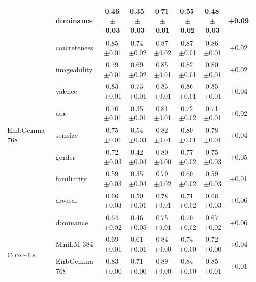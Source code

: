 \begin{table}[t]
\begin{tabular}{@{}llcccccc@{}}
     & dominance & 0.46\,\scriptsize$\pm$0.03 & 0.35\,\scriptsize$\pm$0.03 & 0.71\,\scriptsize$\pm$0.01 & 0.55\,\scriptsize$\pm$0.02 & 0.48\,\scriptsize$\pm$0.03 & +0.09 \\
    \midrule
    \multirow{9}{*}{EmbGemma-768} & concreteness & 0.85\,\scriptsize$\pm$0.01 & 0.74\,\scriptsize$\pm$0.02 & 0.87\,\scriptsize$\pm$0.02 & 0.87\,\scriptsize$\pm$0.01 & 0.86\,\scriptsize$\pm$0.01 & +0.02 \\
     & imageability & 0.79\,\scriptsize$\pm$0.01 & 0.69\,\scriptsize$\pm$0.02 & 0.85\,\scriptsize$\pm$0.01 & 0.82\,\scriptsize$\pm$0.01 & 0.80\,\scriptsize$\pm$0.01 & +0.02 \\
     & valence & 0.83\,\scriptsize$\pm$0.01 & 0.73\,\scriptsize$\pm$0.01 & 0.83\,\scriptsize$\pm$0.01 & 0.86\,\scriptsize$\pm$0.01 & 0.85\,\scriptsize$\pm$0.01 & +0.04 \\
     & aoa & 0.70\,\scriptsize$\pm$0.01 & 0.35\,\scriptsize$\pm$0.01 & 0.81\,\scriptsize$\pm$0.01 & 0.72\,\scriptsize$\pm$0.02 & 0.71\,\scriptsize$\pm$0.01 & +0.02 \\
     & semsize & 0.75\,\scriptsize$\pm$0.01 & 0.54\,\scriptsize$\pm$0.03 & 0.82\,\scriptsize$\pm$0.01 & 0.80\,\scriptsize$\pm$0.01 & 0.78\,\scriptsize$\pm$0.01 & +0.04 \\
     & gender & 0.72\,\scriptsize$\pm$0.03 & 0.42\,\scriptsize$\pm$0.04 & 0.80\,\scriptsize$\pm$0.00 & 0.77\,\scriptsize$\pm$0.02 & 0.75\,\scriptsize$\pm$0.03 & +0.05 \\
     & familiarity & 0.59\,\scriptsize$\pm$0.03 & 0.35\,\scriptsize$\pm$0.04 & 0.79\,\scriptsize$\pm$0.02 & 0.60\,\scriptsize$\pm$0.02 & 0.59\,\scriptsize$\pm$0.03 & +0.01 \\
     & arousal & 0.66\,\scriptsize$\pm$0.03 & 0.50\,\scriptsize$\pm$0.01 & 0.78\,\scriptsize$\pm$0.01 & 0.71\,\scriptsize$\pm$0.02 & 0.66\,\scriptsize$\pm$0.03 & +0.06 \\
     & dominance & 0.64\,\scriptsize$\pm$0.02 & 0.46\,\scriptsize$\pm$0.05 & 0.75\,\scriptsize$\pm$0.01 & 0.70\,\scriptsize$\pm$0.02 & 0.67\,\scriptsize$\pm$0.02 & +0.06 \\
    \midrule
    \multirow{2}{*}{\textsc{Conc-40k}} & MiniLM-384 & 0.69\,\scriptsize$\pm$0.01 & 0.61\,\scriptsize$\pm$0.01 & 0.84\,\scriptsize$\pm$0.00 & 0.74\,\scriptsize$\pm$0.00 & 0.72\,\scriptsize$\pm$0.00 & +0.04 \\
     & EmbGemma-768 & 0.83\,\scriptsize$\pm$0.00 & 0.71\,\scriptsize$\pm$0.00 & 0.89\,\scriptsize$\pm$0.00 & 0.84\,\scriptsize$\pm$0.00 & 0.85\,\scriptsize$\pm$0.01 & +0.01 \\

\end{tabular}
\end{table}

